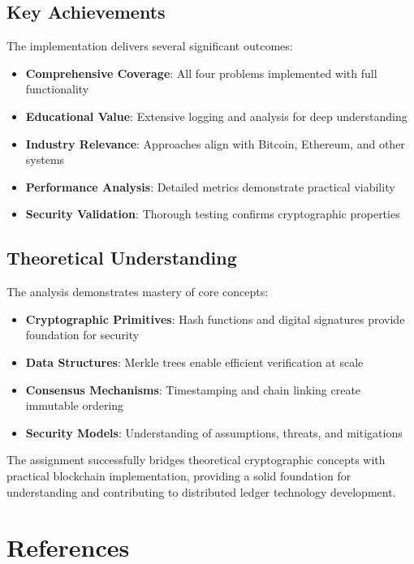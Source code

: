 \documentclass[12pt,a4paper]{article}
\begin{document}
\subsection{Key Achievements}

The implementation delivers several significant outcomes:

\begin{itemize}
    \item \textbf{Comprehensive Coverage}: All four problems implemented with full functionality
    \item \textbf{Educational Value}: Extensive logging and analysis for deep understanding
    \item \textbf{Industry Relevance}: Approaches align with Bitcoin, Ethereum, and other systems
    \item \textbf{Performance Analysis}: Detailed metrics demonstrate practical viability
    \item \textbf{Security Validation}: Thorough testing confirms cryptographic properties
\end{itemize}

\subsection{Theoretical Understanding}

The analysis demonstrates mastery of core concepts:

\begin{itemize}
    \item \textbf{Cryptographic Primitives}: Hash functions and digital signatures provide foundation for security
    \item \textbf{Data Structures}: Merkle trees enable efficient verification at scale
    \item \textbf{Consensus Mechanisms}: Timestamping and chain linking create immutable ordering
    \item \textbf{Security Models}: Understanding of assumptions, threats, and mitigations
\end{itemize}

The assignment successfully bridges theoretical cryptographic concepts with practical blockchain implementation, providing a solid foundation for understanding and contributing to distributed ledger technology development.

\section{References}
\end{document}
